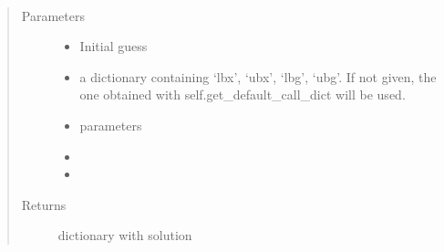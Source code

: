 \documentclass[letterpaper,10pt,english]{sphinxmanual}
\begin{document}
\begin{fulllineitems}
\begin{fulllineitems}
\label{\detokenize{yaocptool.optimization:yaocptool.optimization.abstract_optimization_problem.AbstractOptimizationProblem.set_objective}}
\end{fulllineitems}


\begin{fulllineitems}
\label{\detokenize{yaocptool.optimization:yaocptool.optimization.abstract_optimization_problem.AbstractOptimizationProblem.solve}}~\begin{quote}\begin{description}
\item[{Parameters}] \leavevmode\begin{itemize}
\item {} 
 \textendash{} Initial guess

\item {} 
 \textendash{} a dictionary containing ‘lbx’, ‘ubx’, ‘lbg’, ‘ubg’. If not given, the one obtained with
self.get\_default\_call\_dict will be used.

\item {} 
 \textendash{} parameters

\item {} 
 \textendash{} 

\item {} 
 \textendash{} 

\end{itemize}

\item[{Returns}] \leavevmode
dictionary with solution

\end{description}\end{quote}

\end{fulllineitems}


\end{fulllineitems}
\end{document}

